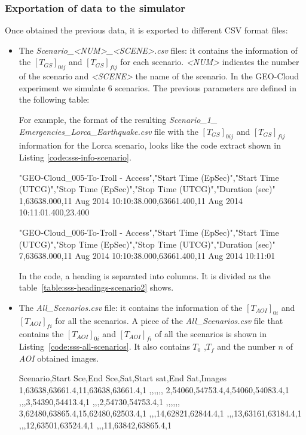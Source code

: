 \subsubsection{Exportation of data to the simulator}

Once obtained the previous data, it is exported to different \ac{CSV} format files:

\begin{itemize}
\item 	The \emph{Scenario\_<NUM>\_<SCENE>.csv} files: it contains the information
  of the $[T_{GS}]_{0ij}$ and $[T_{GS}]_{fij}$ for each scenario. \emph{<NUM>} indicates
  the number of the scenario and \emph{<SCENE>} the name of the scenario. In the
  GEO-Cloud experiment we simulate 6 scenarios. The previous parameters are
  defined in the following table:


For example, the format of the resulting \emph{Scenario\_1\_
Emergencies\_Lorca\_Earthquake.csv} file with the $[T_{GS}]_{0ij}$ and $[T_{GS}]_{fij}$
information for the Lorca scenario, looks like the code extract shown in Listing
\ref{code:sss-info-scenario}.
\begin{listing}[
  float=h!,
  caption  = {Extract of the \emph{Scenario\_1\_Emergencies\_Lorca\_Earthquake.csv}
    of the Lorca scenario},
  label    = code:sss-info-scenario,
style=customc]
"GEO-Cloud_005-To-Troll - Access","Start Time (EpSec)","Start Time (UTCG)","Stop Time (EpSec)","Stop Time (UTCG)","Duration (sec)"
1,63638.000,11 Aug 2014 10:10:38.000,63661.400,11 Aug 2014 10:11:01.400,23.400

"GEO-Cloud_006-To-Troll - Access","Start Time (EpSec)","Start Time (UTCG)","Stop Time (EpSec)","Stop Time (UTCG)","Duration (sec)"
7,63638.000,11 Aug 2014 10:10:38.000,63661.400,11 Aug 2014 10:11:01

\end{listing}
In the code, a heading is separated into columns. It is divided as the
table~\ref{table:sss-headings-scenario2} shows.

\item 	The \emph{All\_Scenarios.csv} file: it contains the information of the $[T_{AOI}]_{0i}$ and $[T_{AOI}]_{fi}$ for all the scenarios.
A piece of the \emph{All\_Scenarios.csv} file that contains the $[T_{AOI}]_{0i}$
and $[T_{AOI}]_{fi}$ of all the scenarios is shown in Listing~\ref{code:sss-all-scenarios}.  It also contains  $T_0$ ,$T_f$ and the number $n$ of \emph{AOI} obtained images.


\begin{listing}[
  float=h!,
  caption  = {Extract of the \emph{All\_Scenarios.csv} code of the Lorca scenario},
  label    = code:sss-all-scenarios,
style=customc]
Scenario,Start Sce,End Sce,Sat,Start sat,End Sat,Images
1,63638,63661.4,11,63638,63661.4,1
,,,,,,
2,54060,54753.4,4,54060,54083.4,1
,,,3,54390,54413.4,1
,,,2,54730,54753.4,1
,,,,,,
3,62480,63865.4,15,62480,62503.4,1
,,,14,62821,62844.4,1
,,,13,63161,63184.4,1
,,,12,63501,63524.4,1
,,,11,63842,63865.4,1
\end{listing}


\end{itemize}
